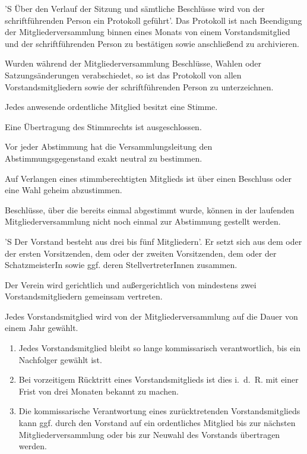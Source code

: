 \documentclass[%
    parskip=half,
]{scrartcl}
\begin{document}
\begin{contract}
'S Über den Verlauf der Sitzung und sämtliche Beschlüsse wird von der schriftführenden Person ein Protokoll geführt'.
Das Protokoll ist nach Beendigung der Mitgliederversammlung binnen eines Monats von einem Vorstandsmitglied und der schriftführenden Person zu bestätigen sowie anschließend zu archivieren.

Wurden während der Mitgliederversammlung Beschlüsse, Wahlen oder Satzungsänderungen verabschiedet, so ist das Protokoll von allen Vorstandsmitgliedern sowie der schriftführenden Person zu unterzeichnen.


Jedes anwesende ordentliche Mitglied besitzt eine Stimme.

Eine Übertragung des Stimmrechts ist ausgeschlossen.

Vor jeder Abstimmung hat die Versammlungsleitung den Abstimmungsgegenstand exakt neutral zu bestimmen.

Auf Verlangen eines stimmberechtigten Mitglieds ist über einen Beschluss oder eine Wahl geheim abzustimmen.

Beschlüsse, über die bereits einmal abgestimmt wurde, können in der laufenden Mitgliederversammlung nicht noch einmal zur Abstimmung gestellt werden.


'S Der Vorstand besteht aus drei bis fünf Mitgliedern'.
Er setzt sich aus dem oder der ersten Vorsitzenden, dem oder der zweiten Vorsitzenden, dem oder der SchatzmeisterIn sowie ggf. deren StellvertreterInnen zusammen.

Der Verein wird gerichtlich und außergerichtlich von mindestens zwei Vorstandsmitgliedern gemeinsam vertreten.

Jedes Vorstandsmitglied wird von der Mitgliederversammlung auf die Dauer von einem Jahr gewählt.

\begin{enumerate}[\qquad a)]
    \item Jedes Vorstandsmitglied bleibt so lange kommissarisch verantwortlich, bis ein Nachfolger gewählt ist.
    \item Bei vorzeitigem Rücktritt eines Vorstandsmitglieds ist dies i.~d.~R. mit einer Frist von drei Monaten bekannt zu machen.
    \item Die kommissarische Verantwortung eines zurücktretenden Vorstandsmitglieds kann ggf. durch den Vorstand auf ein ordentliches Mitglied bis zur nächsten Mitgliederversammlung oder bis zur Neuwahl des Vorstands übertragen werden.
\end{enumerate}


\end{contract}
\end{document}
